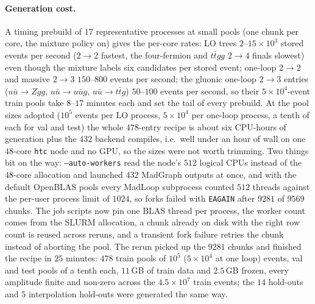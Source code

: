 \documentclass[11pt]{article}
\newcommand{\code}[1]{\texttt{#1}}
\begin{document}
\paragraph{Generation cost.} A timing prebuild of $17$ representative processes at small
pools (one chunk per core, the mixture policy on) gives the per-core rates: LO trees
$2$--$15\times10^3$ stored events per second ($2\to2$ fastest, the four-fermion and
$t\bar t gg$ $2\to4$ finals slowest) even though the mixture labels six candidates per
stored event; one-loop $2\to2$ and massive $2\to3$ $150$--$800$ events per second; the
gluonic one-loop $2\to3$ entries ($u\bar u\to Zgg$, $u\bar u\to u\bar u g$, $u\bar u\to
t\bar t g$) $50$--$100$ events per second, so their $5\times10^4$-event train pools take $8$--$17$
minutes each and set the tail of every prebuild. At the pool sizes adopted ($10^5$ events per
LO process, $5\times10^4$ per one-loop process, a tenth of each for val and test) the whole
$478$-entry recipe is about six CPU-hours of generation plus the $432$ backend compiles,
i.e.\ well under an hour of wall on one $48$-core \code{htc} node and no GPU, so the sizes
were not worth trimming. Two things bit on the way: \code{--auto-workers} read the node's
$512$ logical CPUs instead of the $48$-core allocation and launched $432$ MadGraph outputs
at once, and with the default OpenBLAS pools every MadLoop subprocess counted $512$
threads against the per-user process limit of $1024$, so forks failed with \code{EAGAIN}
after $9281$ of $9569$ chunks. The job scripts now pin one BLAS thread per process, the
worker count comes from the SLURM allocation, a chunk already on disk with the right row
count is reused across reruns, and a transient fork failure retries the chunk instead of
aborting the pool. The rerun picked up the $9281$ chunks and finished the recipe in $25$
minutes: $478$ train pools of $10^5$ ($5\times10^4$ at one loop) events, val and test
pools of a tenth each, $11$\,GB of train data and $2.5$\,GB frozen, every amplitude finite
and non-zero across the $4.5\times10^7$ train events; the $14$ hold-outs and $5$
interpolation hold-outs were generated the same way.
\end{document}
